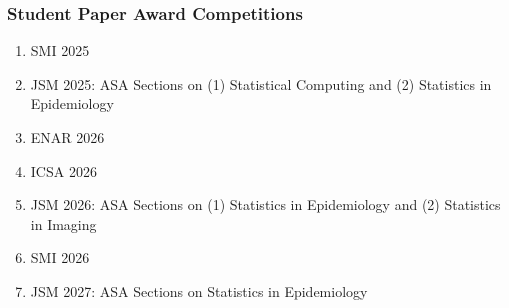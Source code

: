 \documentclass[12pt,letterpaper]{article}
\newenvironment{cventry}{\begin{minipage}[t]{\linewidth}}{\end{minipage}}
\begin{document}
	\subsubsection*{Student Paper Award Competitions}
	\begin{enumerate}
		\item\begin{cventry} SMI 2025
		\par\end{cventry}
		\item\begin{cventry} JSM 2025: ASA Sections on (1) Statistical Computing and 
		(2) Statistics in Epidemiology
		\par\end{cventry}
		\item\begin{cventry} ENAR 2026
		\par\end{cventry}
		\item\begin{cventry} ICSA 2026
		\par\end{cventry}
		\item\begin{cventry} JSM 2026: ASA Sections on (1) Statistics 
		in Epidemiology and (2) Statistics in Imaging
		\par\end{cventry}
		\item\begin{cventry} SMI 2026
		\par\end{cventry}
		\item\begin{cventry} JSM 2027: ASA Sections on Statistics in Epidemiology
		\par\end{cventry}
	\end{enumerate}
	
\end{document}
